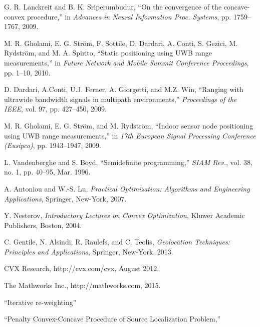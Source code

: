\begin{thebibliography}{99}
G. R. Lanckreit and B. K. Sriperumbudur, ``On the convergence of the concave-convex procedure,'' in  {\em Advances in Neural Information Proc. Systems}, pp. 1759--1767, 2009.

M. R. Gholami, E. G. Str\"om, F. Sottile, D. Dardari, A. Conti, S. Gezici, M. Rydstr\"om, and M. A. Spirito, ``Static positioning using UWB range measurements,'' in {\em Future Network and Mobile Summit Conference Proceedings}, %
pp. 1--10, 2010.

D. Dardari, A.Conti, U.J. Ferner, A. Giorgetti, and M.Z. Win, ``Ranging with ultrawide bandwidth signals in multipath environments,'' {\em Proceedings of the IEEE}, vol. 97, pp. 427--450, 2009.

M. R. Gholami, E. G. Str\"om, and M. Rydstr\"om, ``Indoor sensor node positioning using UWB range measurements,'' in {\em 17th European Signal Processing Conference (Eusipco)}, pp. 1943--1947, 2009.

L. Vandenberghe and S. Boyd, ``Semidefinite programming,'' {\em SIAM Rev.}, vol. 38, no. 1, pp. 40--95, Mar. 1996.

A. Antoniou and W.-S. Lu, {\em Practical Optimization: Algorithms and Engineering Applications}, Springer, New-York, 2007.

Y. Nesterov, {\em Introductory Lectures on Convex Optimization}, Kluwer Academic Publishers, Boston, 2004.

C. Gentile, N. Alsindi, R. Raulefs, and C. Teolis, {\em Geolocation Techniques: Principles and Applications}, Springer, New-York, 2013.

CVX Research, http://cvx.com/cvx, August 2012.

The Mathworks Inc., http://mathworks.com, 2015.

\cite{IRW}
``Iterative re-weighting''

\cite{PCCP}
``Penalty Convex-Concave Procedure of Source Localization Problem,''

\end{thebibliography}